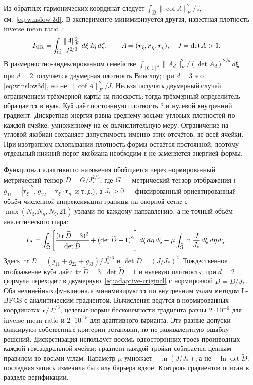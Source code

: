 \documentclass[11pt,a4paper]{article}
\newcommand{\vect}[1]{\boldsymbol{#1}}
\DeclareMathOperator{\tr}{tr}
\begin{document}
Из обратных гармонических координат следует
$\int_{\widehat\Omega}\|\operatorname{cof}A\|_F^2/J$,
см.~\eqref{eq:winslow-3d}. В эксперименте минимизируется другая,
известная плотность inverse mean ratio~\cite{knupp2001}:
\begin{equation}
 I_{\rm MR}=\int_{\widehat\Omega}\frac{\|A\|_F^2}{J^{2/3}}\,d\xi\,d\eta\,d\zeta,
 \qquad A=(\vect r_\xi,\vect r_\eta,\vect r_\zeta),\quad J=\det A>0.
 \label{eq:winslow3d}
\end{equation}
В размерностно-индексированном семействе
$\int_{[0,1]^d}\|A_d\|_F^2/(\det A_d)^{2/d}\,d\boldsymbol\xi$
при $d=2$ получается двумерная плотность Винслоу; при $d=3$ это
\eqref{eq:winslow3d}, но не $\|\operatorname{cof}A\|_F^2/J$.
Нельзя получать двумерный случай ограничением трёхмерной карты на
плоскость: тогда трёхмерный определитель обращается в нуль.
Куб даёт постоянную плотность 3 и нулевой внутренний градиент.
Дискретная энергия равна среднему восьми угловых плотностей по каждой
ячейке, умноженному на её вычислительную меру. Ограничение на угловой
якобиан сохраняет допустимость именно этих отсчётов, не всей ячейки.
При изотропном схлопывании плотность формы остаётся постоянной, поэтому
отдельный нижний порог якобиана необходим и не заменяется энергией формы.

Функционал адаптивного натяжения обобщается через нормированный
метрический тензор
\(\widetilde D=G/J_*^{2/3}\), где \(G\) --- метрический тензор
отображения (\(g_{11}=|\vect r_\xi|^2\),
\(g_{12}=\vect r_\xi\cdot\vect r_\eta\), и т.\,д.),
а $J_*>0$ --- фиксированный ориентированный объём численной аппроксимации
границы на опорной сетке с $\max(N_\xi,N_\eta,N_\zeta,21)$ узлами
по каждому направлению, а не точный объём аналитического шара:
\begin{equation}
I_{\rm A}=\int_{\widehat\Omega}
\left[
\frac{(\tr\widetilde D-3)^2}{\det\widetilde D}
+(\det\widetilde D-1)^2
\right]d\xi\,d\eta\,d\zeta
-\mu\int_{\widehat\Omega}\ln\frac{J}{J_*}\,d\xi\,d\eta\,d\zeta.
\label{eq:adaptive3d}
\end{equation}
Здесь \(\tr\widetilde D=(g_{11}+g_{22}+g_{33})/J_*^{2/3}\) и
\(\det\widetilde D=(J/J_*)^2\). Тождественное отображение куба даёт
\(\tr\widetilde D=3\), \(\det\widetilde D=1\) и нулевую плотность; при
\(d=2\) формула переходит в двумерную~\eqref{eq:adaptive-original} с
нормировкой \(\widetilde D=D/J_*\). Оба
нелинейных функционала минимизируются по внутренним узлам
методом L-BFGS с аналитическим градиентом. Вычисления ведутся
в нормированных координатах $\vect r/J_*^{1/3}$; целевые нормы
бесконечности градиента равны $2\cdot10^{-6}$ для inverse mean ratio
и $2\cdot10^{-5}$ для адаптивного варианта. Эти разные допуски фиксируют
собственные критерии остановки, но не эквивалентную ошибку решений. Дискретизация использует
восемь односторонних троек производных каждой гексаэдральной ячейки;
градиент каждой тройки собирается цепным правилом по восьми углам.
Параметр $\mu$ умножает $-\ln(J/J_*)$, а не $-\ln\det\widetilde D$:
последняя запись изменила бы силу барьера вдвое.
Контроль градиентов описан в разделе верификации.
\end{document}

